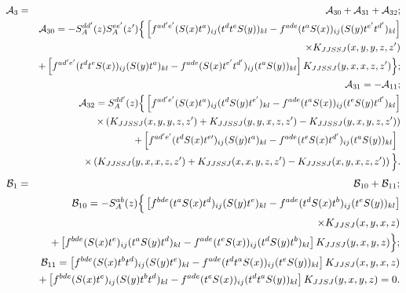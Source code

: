 \documentclass[11pt,a4paper]{article}
\begin{document}
\begin{eqnarray}
{\cal A}_3&=&{\cal A}_{30} +{\cal A}_{31}+{\cal A}_{32}; \nonumber \\ 
&&{\cal A}_{30}= -S_{A}^{dd^{\prime}}(z) S_{A}^{ee^{\prime}}(z^{\prime})
\Big\{ \left[f^{ad^{\prime}e^{\prime}}(S(x)t^{a})_{ij}(t^{d}t^{e}S(y))_{kl}-f^{ade}(t^{a}S(x))_{ij}(S(y)t^{e^{\prime}}t^{d^{\prime}})_{kl}\right]
 \nonumber \\ 
&&\times  K_{JJSSJ}(x,y,y,z,z^{\prime})\nonumber \\
&&+ \left[f^{ad^{\prime}e^{\prime}}(t^{d}t^{e}S(x))_{ij}(S(y)t^{a})_{kl}-f^{ade}(S(x)t^{e^{\prime}}t^{d^{\prime}})_{ij}(t^{a}S(y))_{kl}\right] K_{JJSSJ}(y,x,x,z,z^{\prime})\Big\}; \nonumber \\
&&{\cal A}_{31}=-{\cal A}_{11}; \nonumber \\
&&{\cal A}_{32}= S_{A}^{dd^{\prime}}(z)\Big\{ \left[f^{ad^{\prime}e^{\prime}}(S(x)t^{a})_{ij}(t^{d}S(y)t^{e^\prime})_{kl}-f^{ade}(t^{a}S(x))_{ij}(t^{e}S(y)t^{d^{\prime}})_{kl}\right]\nonumber \\
&&\times \left( K_{JJSSJ}(x,y,y,z,z^{\prime})+K_{JJSSJ}(y,y,x,z,z^{\prime})-K_{JJSSJ}(y,x,y,z,z^{\prime})\right)\nonumber \\
&&+ \left[f^{ad^{\prime}e^{\prime}}(t^{d}S(x)t^{e\prime})_{ij}(S(y)t^{a})_{kl}-f^{ade}(t^{e}S(x)t^{d^{\prime}})_{ij}(t^{a}S(y))_{kl}\right]\ \nonumber \\
&&\times\left( K_{JJSSJ}(y,x,x,z,z^{\prime})+K_{JJSSJ}(x,x,y,z,z^{\prime})-K_{JJSSJ}(x,y,x,z,z^{\prime})\right)\Big\}.
\end{eqnarray}
\begin{eqnarray}
{\cal B}_1&=& {\cal B}_{10}+{\cal B}_{11}; \nonumber \\ 
&&{\cal B}_{10}=-S_{A}^{ab}(z) \Big\{\left[f^{bde}(t^{a}S(x)t^{d})_{ij}(S(y)t^{e})_{kl}-f^{ade}(t^{d}S(x)t^{b})_{ij}(t^{e}S(y))_{kl}\right] \nonumber \\
&&\times K_{JJSJ}(x,y,x,z)\nonumber \\
&&+ \left[f^{bde}(S(x)t^{e})_{ij}(t^{a}S(y)t^{d})_{kl}-f^{ade}(t^{e}S(x))_{ij}(t^{d}S(y)t^{b})_{kl}\right]K_{JJSJ}(y,x,y,z)
\Big\} ; \nonumber \\
&&{\cal B}_{11}=\left[f^{bde}(S(x)t^{b}t^{d})_{ij}(S(y)t^{e})_{kl}-f^{ade}(t^{d}t^{a}S(x))_{ij}(t^{e}S(y))_{kl}\right] K_{JJSJ}(x,y,x,z) \nonumber \\
&&+ \left[f^{bde}(S(x)t^{e})_{ij}(S(y)t^{b}t^{d})_{kl}-f^{ade}(t^{e}S(x))_{ij}(t^{d}t^{a}S(y))_{kl}\right]K_{JJSJ}(y,x,y,z)=0.\nonumber \\
\end{eqnarray}
\end{document}
